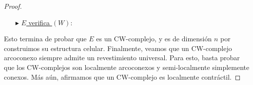 \documentclass[11pt]{article}
\begin{document}
\begin{proof}
\begin{itemize}
\item[$\blacktriangleright$] \underline{$E$ verifica $(W)$}:
\end{itemize}
Esto termina de probar que $E$ es un CW-complejo, y es de dimensi\'on $n$ por construimos su estructura celular. Finalmente, veamos que un CW-complejo arcoconexo siempre admite un revestimiento universal. Para esto, basta probar que los CW-complejos son localmente arcoconexos y semi-localmente simplemente conexos. M\'as a\'un, afirmamos que un CW-complejo es localmente contr\'actil. 
\end{proof}
\end{document}

